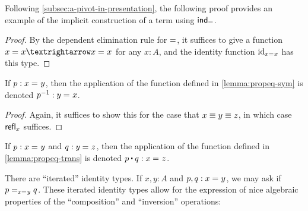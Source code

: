\documentclass[./thesis.tex]{subfiles}
\begin{document}

Following \cref{subsec:a-pivot-in-presentation}, the following proof provides
an example of the implicit construction of a term using $\ind_{\propeqsign}$.

\begin{proof}
  By the dependent elimination rule for $\propeqsign$, it suffices to give a
  function $\propeq{}{x}{x}→\propeq{}{x}{x}$ for any $x:A$, and the identity
  function $\id_{\propeq{}{x}{x}}$ has this type.
\end{proof}

If $p:\propeq{}{x}{y}$, then the application of
the function defined in \cref{lemma:propeq-sym} is denoted
$p^{-1}:\propeq{}{y}{x}$. 

\begin{proof}
  Again, it suffices to show this for the case that $x\jdeq y\jdeq z$, 
  in which case $\refl{x}$ suffices.
\end{proof}

If $p:\propeq{}{x}{y}$ and $q:\propeq{}{y}{z}$, then the application of
the function defined in \cref{lemma:propeq-trans} is denoted
$p\ct q:\propeq{}{x}{z}$.

There are ``iterated'' identity types. If $x,y:A$ and $p,q:\propeq{}{x}{y}$, we
may ask if $\propeq{\propeq{}{x}{y}}{p}{q}$. These iterated identity types
allow for the expression of nice algebraic properties of the ``composition''
and ``inversion'' operations:
\end{document}

